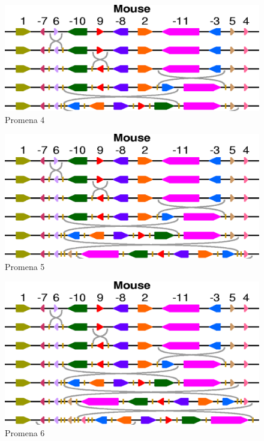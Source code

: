 \begin{figure}[h!]
\centering
\includegraphics[scale=0.32]{poglavlja/6/slike/niz4.png}
\caption{Promena 4}
\label{slika:X}
\end{figure}

\begin{figure}[h!]
\centering
\includegraphics[scale=0.32]{poglavlja/6/slike/niz5.png}
\caption{Promena 5}
\label{slika:X}
\end{figure}

\begin{figure}[h!]
\centering
\includegraphics[scale=0.32]{poglavlja/6/slike/niz6.png}
\caption{Promena 6}
\label{slika:X}
\end{figure}


